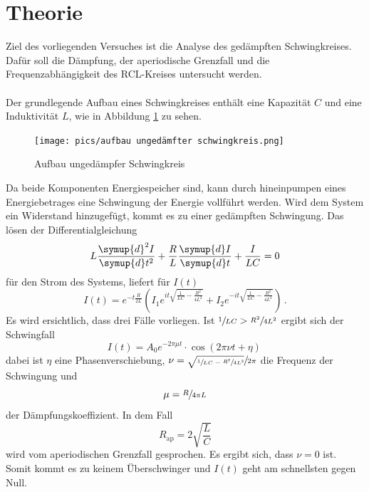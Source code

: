 \section{Theorie}
\label{sec:Theorie}
Ziel des vorliegenden Versuches ist die Analyse des gedämpften Schwingkreises.
Dafür soll die Dämpfung, der aperiodische Grenzfall und die Frequenzabhängigkeit des RCL-Kreises untersucht werden.\\
\\
Der grundlegende Aufbau eines Schwingkreises enthält eine Kapazität $C$ und eine Induktivität $L$, wie in Abbildung \ref{fig:unged} zu sehen.
\begin{figure}
    \centering
    \caption{Aufbau ungedämpfer Schwingkreis \cite{v354}} 
    \label{fig:unged}
    \texttt{[image: pics/aufbau ungedämfter schwingkreis.png]}
\end{figure}
Da beide Komponenten Energiespeicher sind, kann durch hineinpumpen eines Energiebetrages eine Schwingung der Energie vollführt werden.
Wird dem System ein Widerstand hinzugefügt, kommt es zu einer gedämpften Schwingung. Das lösen der Differentialgleichung
\begin{equation}
    L \frac{\symup{d}^2 I}{\symup{d} t^2} + \frac{R}{L} \frac{\symup{d} I}{\symup{d} t} + \frac{I}{LC}=0
    \label{eqn:DGL}
\end{equation}
für den Strom des Systems, liefert für $I(t)$
\begin{equation}
    I(t)=e^{-t \frac{R}{2L}} \left(I_1 e^{i t \sqrt{\frac{1}{L C} - \frac{R^2}{4 L^2}}}+ I_2 e^{-i t \sqrt{\frac{1}{L C} - \frac{R^2}{4 L^2}}} \right) \, .
\end{equation}
Es wird ersichtlich, dass drei Fälle vorliegen. Ist $ \sfrac{1}{LC}> \sfrac{R^2}{4 L^2}$ ergibt sich der Schwingfall
\begin{equation}
    I(t)=A_0 e^{- 2 \pi \mu t} \cdot \cos(2 \pi \nu t + \eta) \, 
\end{equation}
dabei ist $\eta$ eine Phasenverschiebung, $\nu=\sfrac{\sqrt{\sfrac{1}{L C}-\sfrac{R^2}{4 L^2}}}{2 \pi}$ die Frequenz der Schwingung und
\begin{equation}
    \mu=\sfrac{R}{4 \pi L}
    \label{eqn:muuh}
\end{equation}
der Dämpfungskoeffizient.
In dem Fall 
\begin{equation}
    R_\text{ap}=2 \sqrt{\frac{L}{C}}
    \label{eqn:apbed}
\end{equation}
wird vom aperiodischen Grenzfall gesprochen. Es ergibt sich, dass $\nu = 0$ ist. Somit kommt es zu keinem Überschwinger und $I(t)$ geht am schnellsten gegen Null.\\
